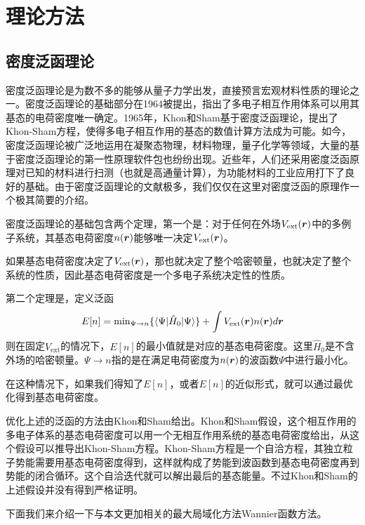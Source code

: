 \chapter{理论方法}
\label{cha:method}

\section{密度泛函理论}

密度泛函理论是为数不多的能够从量子力学出发，直接预言宏观材料性质的理论之一。密度泛函理论的基础部分在1964被提出\cite{hohenberg_inhomogeneous_1964}，指出了多电子相互作用体系可以用其基态的电荷密度唯一确定。1965年，Khon和Sham\cite{kohn_self-consistent_1965}基于密度泛函理论，提出了Khon-Sham方程，使得多电子相互作用的基态的数值计算方法成为可能。如今，密度泛函理论被广泛地运用在凝聚态物理，材料物理，量子化学等领域，大量的基于密度泛函理论的第一性原理软件包也纷纷出现。近些年，人们还采用密度泛函原理对已知的材料进行扫测（也就是高通量计算），为功能材料的工业应用打下了良好的基础。由于密度泛函理论的文献极多，我们仅仅在这里对密度泛函的原理作一个极其简要的介绍。

密度泛函理论的基础包含两个定理，第一个是：对于任何在外场$V_{\text{ext}}(\boldsymbol{r})$中的多例子系统，其基态电荷密度$n(\boldsymbol{r})$能够唯一决定$V_{\text{ext}}(\boldsymbol{r})$。

如果基态电荷密度决定了$V_{\text{ext}}(\boldsymbol{r})$，那也就决定了整个哈密顿量，也就决定了整个系统的性质，因此基态电荷密度是一个多电子系统决定性的性质。

第二个定理是，定义泛函
\begin{equation}
    E[n] = \text{min}_{\Psi\to n} \{\langle\Psi|\hat{H}_0|\Psi\rangle\}+\int V_\text{ext}(\boldsymbol{r}) n(\boldsymbol{r}) d\boldsymbol{r}
\end{equation}
则在固定$V_\text{ext}$的情况下，$E[n]$的最小值就是对应的基态电荷密度。这里$\hat{H}_0$是不含外场的哈密顿量。$\Psi\to n$指的是在满足电荷密度为$n(\boldsymbol{r})$的波函数$\Psi$中进行最小化。

在这种情况下，如果我们得知了$E[n]$，或者$E[n]$的近似形式，就可以通过最优化得到基态电荷密度。

优化上述的泛函的方法由Khon和Sham给出。Khon和Sham假设，这个相互作用的多电子体系的基态电荷密度可以用一个无相互作用系统的基态电荷密度给出，从这个假设可以推导出Khon-Sham方程。Khon-Sham方程是一个自洽方程，其独立粒子势能需要用基态电荷密度得到，这样就构成了势能到波函数到基态电荷密度再到势能的闭合循环。这个自洽迭代就可以解出最后的基态能量。不过Khon和Sham的上述假设并没有得到严格证明。

下面我们来介绍一下与本文更加相关的最大局域化方法Wannier函数方法。

